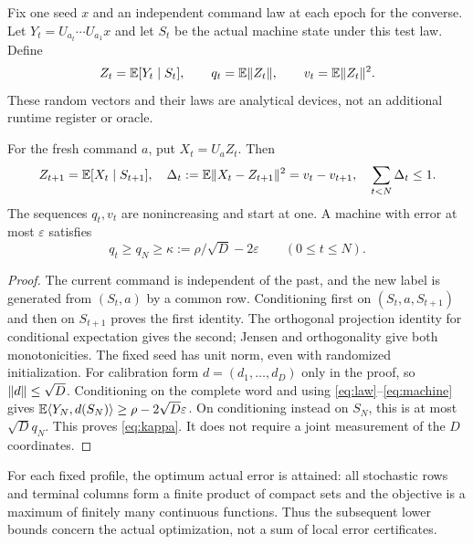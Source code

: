 Fix one seed $x$ and an independent command law at each epoch for the
converse. Let $Y_t=U_{a_t}\cdots U_{a_1}x$ and let $S_t$ be the actual
machine state under this test law. Define
\begin{equation}\label{eq:centroids}
 Z_t=\mathbb E[Y_t\mid S_t],\qquad q_t=\mathbb E\lVert Z_t\rVert,\qquad
 v_t=\mathbb E\lVert Z_t\rVert^2.
\end{equation}
These random vectors and their laws are analytical devices, not an
additional runtime register or oracle.
\begin{lemma}\label{lem:terminal}
For the fresh command $a$, put $X_t=U_aZ_t$. Then
\begin{equation}\label{eq:conditional}
 Z_{t+1}=\mathbb E[X_t\mid S_{t+1}],\quad
 \Delta_t:=\mathbb E\lVert X_t-Z_{t+1}\rVert^2=v_t-v_{t+1},\quad
 \sum_{t<N}\Delta_t\le1.
\end{equation}
The sequences $q_t,v_t$ are nonincreasing and start at one. A machine
with error at most $\varepsilon$ satisfies
\begin{equation}\label{eq:kappa}
 q_t\ge q_N\ge\kappa:=\rho/\sqrt D-2\varepsilon
 \qquad(0\le t\le N).
\end{equation}
\end{lemma}
\begin{proof}
The current command is independent of the past, and the new label is
generated from $(S_t,a)$ by a common row. Conditioning first on
$(S_t,a,S_{t+1})$ and then on $S_{t+1}$ proves the first identity.
The orthogonal projection identity for conditional expectation gives
the second; Jensen and orthogonality give both monotonicities.
The fixed seed has unit norm, even with randomized initialization.
For calibration form $d=(d_1,\ldots,d_D)$ only in the proof, so
$\lVert d\rVert\le\sqrt D$. Conditioning on the complete word and using
\eqref{eq:law}--\eqref{eq:machine} gives
$\mathbb E\langle Y_N,d(S_N)\rangle\ge\rho-2\sqrt D\varepsilon$.
On conditioning instead on $S_N$, this is at most $\sqrt D q_N$.
This proves \eqref{eq:kappa}. It does not require a joint measurement
of the $D$ coordinates.
\end{proof}
For each fixed profile, the optimum actual error is attained: all
stochastic rows and terminal columns form a finite product of compact
sets and the objective is a maximum of finitely many continuous
functions. Thus the subsequent lower bounds concern the actual
optimization, not a sum of local error certificates.

